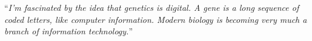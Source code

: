 \documentclass[
11pt, %
english, %
singlespacing, %
headsepline, %
]{MastersDoctoralThesis} %
\begin{document}

%
% 
% 



\vspace*{0.2\textheight}

\noindent\enquote{\itshape I'm fascinated by the idea that genetics is digital. A gene is a long sequence of coded letters, like computer information. Modern biology is becoming very much a branch of information technology.}\bigbreak
\end{document}
